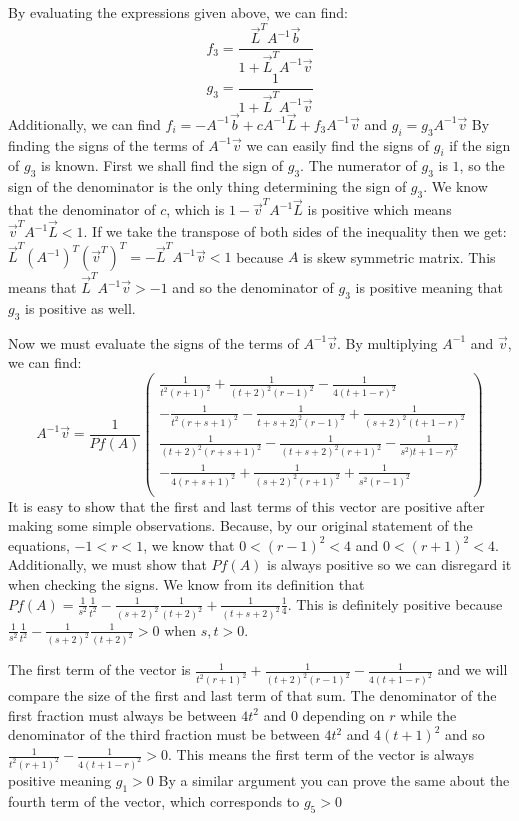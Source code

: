 \documentclass[11pt,leqno]{article}
\theoremstyle{definition}
\theoremstyle{remark}
\numberwithin{equation}{section}
\begin{document}
By evaluating the expressions given above, we can find: 
$$f_3=\frac{\vec{L}^T A^{-1}\vec{b}}{1+\vec{L}^T A^{-1}\vec{v}}$$
$$g_3=\frac{1}{1+\vec{L}^T A^{-1} \vec{v}}$$
Additionally, we can find $f_i=-A^{-1}\vec{b}+cA^{-1}\vec{L}+f_3A^{-1}\vec{v}$ and $g_i=g_3 A^{-1}\vec{v}$
By finding the signs of the terms of $A^{-1}\vec{v}$ we can easily find the signs of $g_i$ if the sign of $g_3$ is known. First we shall find the sign of $g_3$.
The numerator of $g_3$ is $1$, so the sign of the denominator is the only thing determining the sign of $g_3$.
We know that the denominator of $c$, which is $1-\vec{v}^T A^{-1}\vec{L}$ is positive which means $\vec{v}^T A^{-1}\vec{L}<1$.
If we take the transpose of both sides of the inequality then we get: $\vec{L}^T (A^{-1})^T (\vec{v}^T)^T=-\vec{L}^T A^{-1} \vec{v}<1$ because $A$ is skew symmetric matrix. This means that $\vec{L}^T A^{-1} \vec{v}>-1$ and so the denominator of $g_3$ is positive meaning that $g_3$ is positive as well.

Now we must evaluate the signs of the terms of $A^{-1}\vec{v}$. By multiplying $A^{-1}$ and $\vec{v}$, we can find:
$$A^{-1}\vec{v}=\frac{1}{Pf(A)} \left( {\begin{array}{c}
\frac{1}{t^2(r+1)^2}+\frac{1}{(t+2)^2(r-1)^2}-\frac{1}{4(t+1-r)^2} \\
-\frac{1}{t^2(r+s+1)^2}-\frac{1}{t+s+2)^2(r-1)^2}+\frac{1}{(s+2)^2(t+1-r)^2} \\
\frac{1}{(t+2)^2(r+s+1)^2}-\frac{1}{(t+s+2)^2(r+1)^2}-\frac{1}{s^2)t+1-r)^2} \\
-\frac{1}{4(r+s+1)^2}+\frac{1}{(s+2)^2(r+1)^2}+\frac{1}{s^2(r-1)^2} \\
\end{array} } \right)
$$
It is easy to show that the first and last terms of this vector are positive after making some simple observations. Because, by our original statement of the equations, $-1<r<1$, we know that $0<(r-1)^2<4$ and $0<(r+1)^2<4$. Additionally, we must show that $Pf(A)$ is always positive so we can disregard it when checking the signs. We know from its definition that $Pf(A)=\frac{1}{s^2}\frac{1}{t^2}-\frac{1}{(s+2)^2}\frac{1}{(t+2)^2}+\frac{1}{(t+s+2)^2}\frac{1}{4}$. This is definitely positive because $\frac{1}{s^2}\frac{1}{t^2}-\frac{1}{(s+2)^2}\frac{1}{(t+2)^2}>0$ when $s,t>0$.

The first term of the vector is $\frac{1}{t^2(r+1)^2}+\frac{1}{(t+2)^2(r-1)^2}-\frac{1}{4(t+1-r)^2}$ and we will compare the size of the first and last term of that sum. The denominator of the first fraction must always be between $4t^2$ and $0$ depending on $r$ while the denominator of the third fraction must be between $4t^2$ and $4(t+1)^2$ and so $\frac{1}{t^2(r+1)^2}-\frac{1}{4(t+1-r)^2}>0$.
This means the first term of the vector is always positive meaning $g_1>0$
By a similar argument you can prove the same about the fourth term of the vector, which corresponds to $g_5>0$
\end{document}
